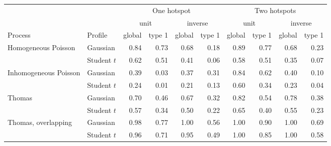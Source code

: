 \begin{tabular}{@{}llrrrrrrrr@{}}
\toprule
 & & \multicolumn{4}{c}{One hotspot} & \multicolumn{4}{c}{Two hotspots} \\
\cmidrule(lr){3-6}\cmidrule(lr){7-10}
 & & \multicolumn{2}{c}{unit} & \multicolumn{2}{c}{inverse} & \multicolumn{2}{c}{unit} & \multicolumn{2}{c}{inverse} \\
Process & Profile & global & type 1 & global & type 1 & global & type 1 & global & type 1 \\
\midrule
Homogeneous Poisson & Gaussian & 0.84 & 0.73 & 0.68 & 0.18 & 0.89 & 0.77 & 0.68 & 0.23 \\
 & Student $t$ & 0.62 & 0.51 & 0.41 & 0.06 & 0.58 & 0.51 & 0.35 & 0.07 \\
Inhomogeneous Poisson & Gaussian & 0.39 & 0.03 & 0.37 & 0.31 & 0.84 & 0.62 & 0.40 & 0.10 \\
 & Student $t$ & 0.24 & 0.01 & 0.21 & 0.13 & 0.60 & 0.34 & 0.23 & 0.04 \\
Thomas & Gaussian & 0.70 & 0.46 & 0.67 & 0.32 & 0.82 & 0.54 & 0.78 & 0.38 \\
 & Student $t$ & 0.57 & 0.34 & 0.50 & 0.22 & 0.65 & 0.40 & 0.55 & 0.23 \\
Thomas, overlapping & Gaussian & 0.98 & 0.77 & 1.00 & 0.56 & 1.00 & 0.90 & 1.00 & 0.69 \\
 & Student $t$ & 0.96 & 0.71 & 0.95 & 0.49 & 1.00 & 0.85 & 1.00 & 0.58 \\
\bottomrule
\end{tabular}
